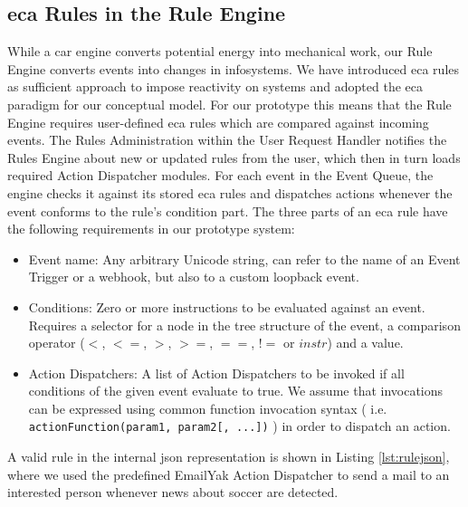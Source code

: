 \subsection{\acrshort{eca} Rules in the Rule Engine}
While a car engine converts potential energy into mechanical work, our \textrm{Rule Engine} converts events into changes in \textrm{\glspl{infosystem}}.
We have introduced \textrm{\acrshort{eca}} rules as sufficient approach to impose reactivity on systems and adopted the \textrm{\acrshort{eca}} paradigm for our conceptual model.
For our prototype this means that the \textrm{Rule Engine} requires user-defined \textrm{\acrshort{eca}} rules which are compared against incoming events.
The \textrm{Rules Administration} within the \textrm{User Request Handler} notifies the \textrm{Rules Engine} about new or updated rules from the user, which then in turn loads required \textrm{Action Dispatcher} modules.
For each event in the \textrm{Event Queue}, the engine checks it against its stored \textrm{\acrshort{eca}} rules and dispatches actions whenever the event conforms to the rule's condition part.
The three parts of an \textrm{\acrshort{eca}} rule have the following requirements in our prototype system:
\begin{itemize}
	\item Event name: Any arbitrary Unicode string, can refer to the name of an \textrm{Event Trigger} or a \textrm{\gls{webhook}}, but also to a custom loopback event.
	\item Conditions: Zero or more instructions to be evaluated against an event. Requires a selector for a node in the tree structure of the event, a comparison operator ($<$, $<=$, $>$, $>=$, $==$, $!=$ or $instr$) and a value.
	\item Action Dispatchers: A list of \textrm{Action Dispatchers} to be invoked if all conditions of the given event evaluate to true. We assume that invocations can be expressed using common function invocation syntax ( i.e. \texttt{actionFunction(param1, param2[, ...])} ) in order to dispatch an action.
\end{itemize}
A valid rule in the internal \textrm{\acrshort{json}} representation is shown in Listing \ref{lst:rulejson}, where we used the predefined \textrm{EmailYak Action Dispatcher} to send a mail to an interested person whenever news about soccer are detected.

